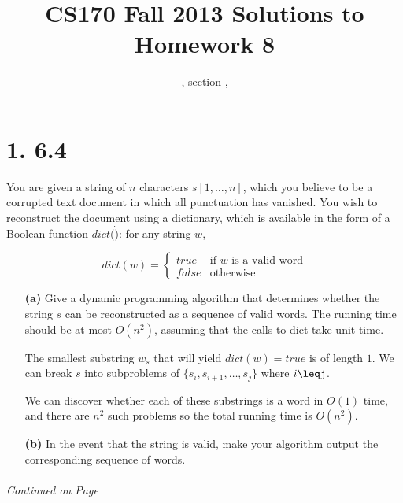 \documentclass[11pt]{article}
\title{CS170  Fall 2013 Solutions to Homework 8}
\author{\Name, section \Sec, \texttt{\Login}}
\begin{document}
\maketitle

\section*{1. 6.4}

You are given a string of $n$ characters $s[1,\ldots,n]$, which you believe to be a corrupted text document
in which all punctuation has vanished. You wish to reconstruct the document using a dictionary, 
which is available in the form of a Boolean function $dict(\dot)$: for any string $w$,

\begin{displaymath}
   dict(w) = \left\{
     \begin{array}{lr}
       true  & \mbox{if $w$ is a valid word}\\
       false & \mbox{otherwise}
     \end{array}
   \right.
\end{displaymath} 

\begin{itemize}

\item[{\bf (a)}] Give a dynamic programming algorithm that determines whether the string $s$ can be reconstructed as a sequence of valid words.
The running time should be at most $O(n^2)$, assuming that the calls to dict take unit time.

The smallest substring $w_s$ that will yield $dict(w) = true$ is of length $1$.
We can break $s$ into subproblems of $\{s_i,s_{i+1},\ldots,s_j\}$ where $i\leqj$. 


We can discover whether each of these substrings is a word in $O(1)$ time, and there are $n^2$ such problems so the
total running time is $O(n^2)$.

\item[{\bf (b)}] In the event that the string is valid, make your algorithm output the corresponding sequence of words.

\end{itemize}
\label{pg:end-of-p1}
%
 \paragraph{} \emph{Continued on Page \pageref{pg:p1-continuation}}
\end{document}
